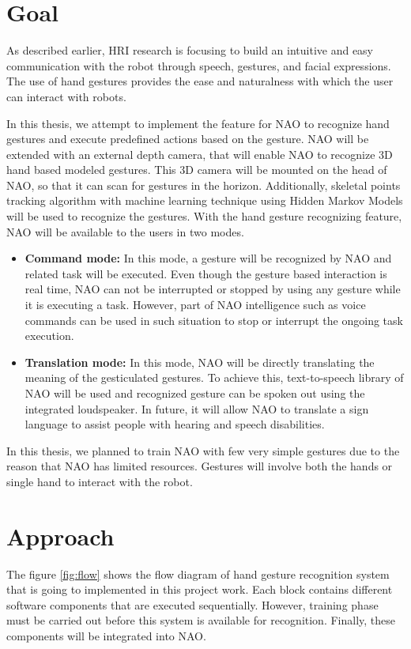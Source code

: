 \chapter{Goal} As described earlier, HRI research is focusing to build an intuitive and easy communication with the robot through speech, gestures, and facial expressions. The use of hand gestures provides the ease and naturalness with which the user can interact with robots.

In this thesis, we attempt to implement the feature for NAO to recognize hand gestures and execute predefined actions based on the gesture. NAO will be extended with an external depth camera, that will enable NAO to recognize 3D hand based modeled gestures. This 3D camera will be mounted on the head of NAO, so that it can scan for gestures in the horizon. Additionally, skeletal points tracking algorithm with machine learning technique using Hidden Markov Models will be used to recognize the gestures. With the hand gesture recognizing feature, NAO will be available to the users in two modes.

\begin{itemize}
	\item \textbf{Command mode:} In this mode, a gesture will be recognized by NAO and related task will be executed. Even though the gesture based interaction is real time, NAO can not be interrupted or stopped by using any gesture while it is executing a task. However, part of NAO intelligence such as voice commands can be used in such situation to stop or interrupt the ongoing task execution.
	\item \textbf{Translation mode:} In this mode, NAO will be directly translating the meaning of the gesticulated gestures. To achieve this, text-to-speech library of NAO will be used and recognized gesture can be spoken out using the integrated loudspeaker. In future, it will allow NAO to translate a sign language to assist people with hearing and speech disabilities.
\end{itemize}

In this thesis, we planned to train NAO with few very simple gestures due to the reason that NAO has limited resources. Gestures will involve both the hands or single hand to interact with the robot.

\chapter{Approach} The figure \ref{fig:flow} shows the flow diagram of hand gesture recognition system that is going to implemented in this project work. Each block contains different software components that are executed sequentially. However, training phase must be carried out before this system is available for recognition. Finally, these components will be integrated into NAO.

